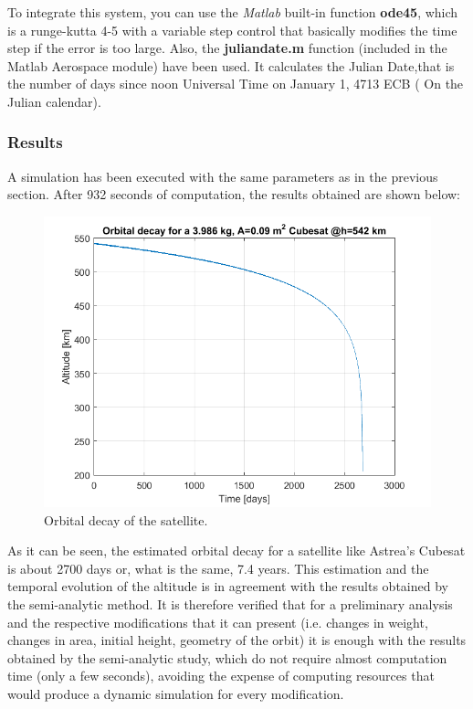 To integrate this system, you can use the \emph{Matlab} built-in function \textbf{ode45}, which is a runge-kutta 4-5 with a variable step control that basically modifies the time step if the error is too large.
Also, the \textbf{juliandate.m} function (included in the Matlab Aerospace module) have been used. It calculates the Julian Date,that is the number of days since noon Universal Time on January 1, 4713 ECB ( On the Julian calendar).

\subsubsection{Results}
A simulation has been executed with the same parameters as in the previous section. After 932 seconds of computation, the results obtained are shown below:

\begin{figure}[H]
\centering
\includegraphics[scale=1]{./decay/graph.png}
\caption{Orbital decay of the satellite.}
\label{fig:COE}
\end{figure}

As it can be seen, the estimated orbital decay for a satellite like Astrea's Cubesat is about 2700 days or, what is the same, 7.4 years. This estimation and the temporal evolution of the altitude is in agreement with the results obtained by the semi-analytic method. It is therefore verified that for a preliminary analysis and the respective modifications that it can present (i.e. changes in weight, changes in area, initial height, geometry of the orbit) it is enough with the results obtained by the semi-analytic study, which do not require almost computation time (only a few seconds), avoiding the expense of computing resources that would produce a dynamic simulation for every modification.